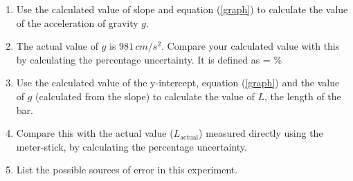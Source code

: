 \documentclass{article}
\begin{document}
      \begin{enumerate}

         \item Use the calculated value of slope and equation (\ref{graph}) to calculate the value of the acceleration of gravity $g$.
         
         \item The actual value of $g$ is $981 \, cm/s^2$. Compare your calculated value with this by calculating the percentage uncertainty. It is defined as
         \beq
          =   \%
         \eeq

         \item Use the calculated value of the y-intercept, equation (\ref{graph}) and the value of $g$ (calculated from the slope) to calculate the value of $L$, the length of the bar.

         \item Compare this with the actual value ($L_\text{actual}$) measured directly using the meter-stick, by calculating the percentage uncertainty.

         \item List the possible sources of error in this experiment.

   \end{enumerate}
\end{document}
